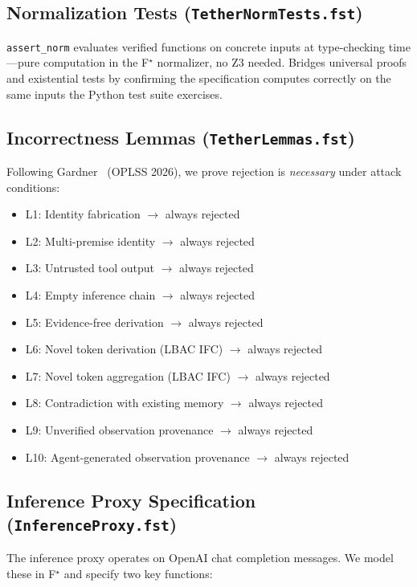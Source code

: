 \documentclass[sigplan,screen,nonacm]{acmart}
\newcommand{\fstar}{F\ensuremath{^\star}}
\begin{document}
\subsection{Normalization Tests (\texttt{TetherNormTests.fst})}

\texttt{assert\_norm} evaluates verified functions on concrete inputs at
type-checking time---pure computation in the \fstar{} normalizer, no Z3
needed. Bridges universal proofs and existential tests by confirming the
specification computes correctly on the same inputs the Python test suite
exercises.

\subsection{Incorrectness Lemmas (\texttt{TetherLemmas.fst})}

Following Gardner~\cite{gardner2026incorrectness} (OPLSS 2026), we prove
rejection is \emph{necessary} under attack conditions:

\begin{itemize}
  \item L1: Identity fabrication $\to$ always rejected
  \item L2: Multi-premise identity $\to$ always rejected
  \item L3: Untrusted tool output $\to$ always rejected
  \item L4: Empty inference chain $\to$ always rejected
  \item L5: Evidence-free derivation $\to$ always rejected
  \item L6: Novel token derivation (LBAC IFC) $\to$ always rejected
  \item L7: Novel token aggregation (LBAC IFC) $\to$ always rejected
  \item L8: Contradiction with existing memory $\to$ always rejected
  \item L9: Unverified observation provenance $\to$ always rejected
  \item L10: Agent-generated observation provenance $\to$ always rejected
\end{itemize}


\subsection{Inference Proxy Specification (\texttt{InferenceProxy.fst})}
\label{sec:proxy-spec}

The inference proxy operates on OpenAI chat completion messages. We model
these in \fstar{} and specify two key functions:
\end{document}
